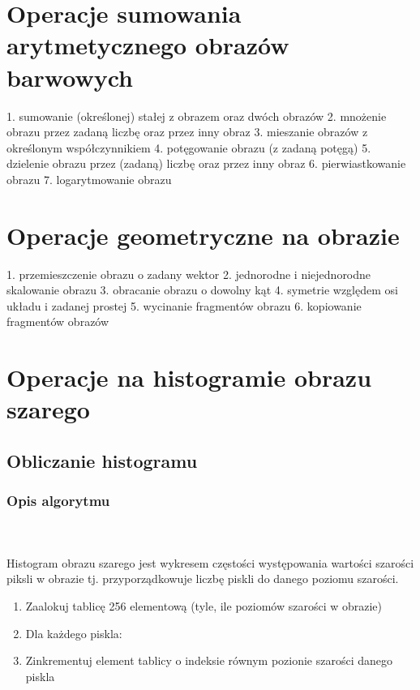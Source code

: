 \documentclass[final,a4paper,openany,12pt]{mwbk}
\begin{document}
\chapter{Operacje sumowania arytmetycznego obrazów barwowych}
1. sumowanie (określonej) stałej z obrazem oraz dwóch obrazów
2. mnożenie obrazu przez zadaną liczbę oraz przez inny obraz
3. mieszanie obrazów z określonym współczynnikiem
4. potęgowanie obrazu (z zadaną potęgą)
5. dzielenie obrazu przez (zadaną) liczbę oraz przez inny obraz
6. pierwiastkowanie obrazu
7. logarytmowanie obrazu

\chapter{Operacje geometryczne na obrazie}
1. przemieszczenie obrazu o zadany wektor
2. jednorodne i niejednorodne skalowanie obrazu
3. obracanie obrazu o dowolny kąt
4. symetrie względem osi układu i zadanej prostej
5. wycinanie fragmentów obrazu
6. kopiowanie fragmentów obrazów

\chapter{Operacje na histogramie obrazu szarego}
\pagebreak
\section{Obliczanie histogramu}
\subsection*{Opis algorytmu}
\hfill
\\\\
\indent 
Histogram obrazu szarego jest wykresem częstości występowania wartości szarości piksli w obrazie tj.
przyporządkowuje liczbę piskli do danego poziomu szarości.\newline
\begin{enumerate}
	\item Zaalokuj tablicę 256 elementową (tyle, ile poziomów szarości w obrazie)
	\item Dla każdego piskla:
	\item Zinkrementuj element tablicy o indeksie równym pozionie szarości danego piskla
\end{enumerate}
\end{document}
